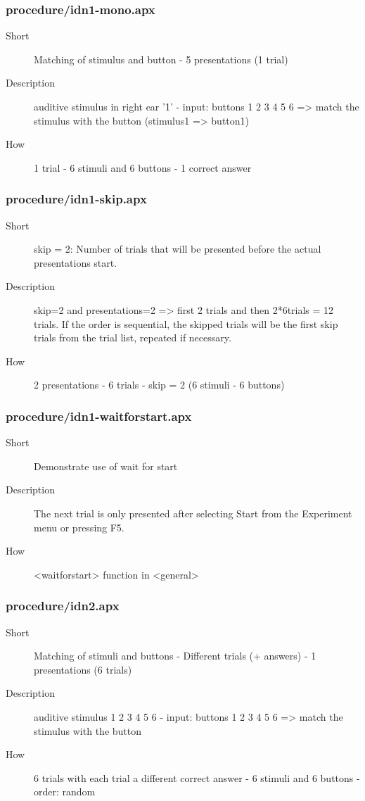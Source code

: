 \subsubsection{procedure/idn1-mono.apx}
\begin{description}
\item[Short] 
 Matching of stimulus and button - 5 presentations (1 trial)
\item[Description] 
 auditive stimulus in right ear '1' - input: buttons 1 2 3 4 5 6 =\textgreater{} match the stimulus with the button (stimulus1 =\textgreater{} button1)
\item[How] 
 1 trial - 6 stimuli and 6 buttons - 1 correct answer
\end{description}

\subsubsection{procedure/idn1-skip.apx}
\begin{description}
\item[Short] 
 skip = 2: Number of trials that will be presented before the actual presentations start.
\item[Description] 
 skip=2 and presentations=2 =\textgreater{} first 2 trials and then 2*6trials = 12 trials. If the order is sequential, the skipped trials will be the first skip trials from the trial list, repeated if necessary.
\item[How] 
 2 presentations - 6 trials - skip = 2 (6 stimuli - 6 buttons)
\end{description}

\subsubsection{procedure/idn1-waitforstart.apx}
\begin{description}
\item[Short] 
 Demonstrate use of wait for start
\item[Description] 
 The next trial is only presented after selecting Start from the Experiment menu or pressing F5.
\item[How] 
 \textless{}waitforstart\textgreater{} function in \textless{}general\textgreater{}
\end{description}

\subsubsection{procedure/idn2.apx}
\begin{description}
\item[Short] 
 Matching of stimuli and buttons - Different trials (+ answers) - 1 presentations (6 trials)
\item[Description] 
 auditive stimulus 1 2 3 4 5 6 - input: buttons 1 2 3 4 5 6 =\textgreater{} match the stimulus with the button
\item[How] 
 6 trials with each trial a different correct answer - 6 stimuli and 6 buttons - order: random
\end{description}

